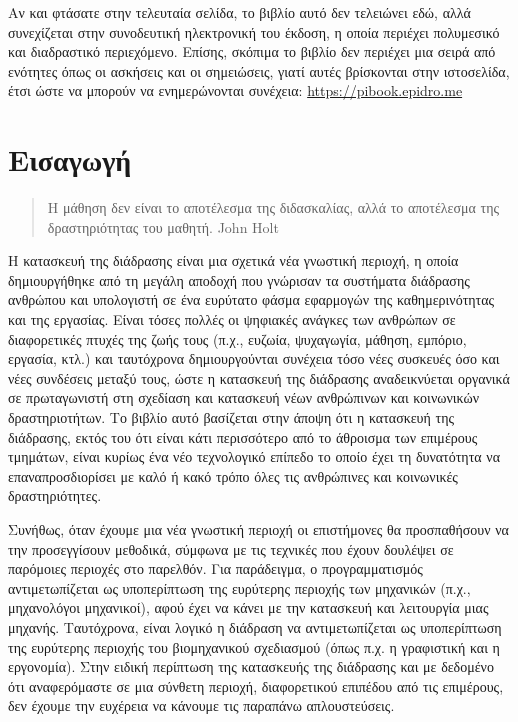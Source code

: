 \documentclass[
]{article}
\begin{document}
Αν και φτάσατε στην τελευταία σελίδα, το βιβλίο αυτό δεν τελειώνει εδώ,
αλλά συνεχίζεται στην συνοδευτική ηλεκτρονική του έκδοση, η οποία
περιέχει πολυμεσικό και διαδραστικό περιεχόμενο. Επίσης, σκόπιμα το
βιβλίο δεν περιέχει μια σειρά από ενότητες όπως οι ασκήσεις και οι
σημειώσεις, γιατί αυτές βρίσκονται στην ιστοσελίδα, έτσι ώστε να μπορούν
να ενημερώνονται συνέχεια: \url{https://pibook.epidro.me}

\hypertarget{ux3b5ux3b9ux3c3ux3b1ux3b3ux3c9ux3b3ux3ae}{%
\section{Εισαγωγή}\label{ux3b5ux3b9ux3c3ux3b1ux3b3ux3c9ux3b3ux3ae}}

\begin{quote}
Η μάθηση δεν είναι το αποτέλεσμα της διδασκαλίας, αλλά το αποτέλεσμα της
δραστηριότητας του μαθητή. John Holt
\end{quote}

Η κατασκευή της διάδρασης είναι μια σχετικά νέα γνωστική περιοχή, η
οποία δημιουργήθηκε από τη μεγάλη αποδοχή που γνώρισαν τα συστήματα
διάδρασης ανθρώπου και υπολογιστή σε ένα ευρύτατο φάσμα εφαρμογών της
καθημερινότητας και της εργασίας. Είναι τόσες πολλές οι ψηφιακές ανάγκες
των ανθρώπων σε διαφορετικές πτυχές της ζωής τους (π.χ., ευζωία,
ψυχαγωγία, μάθηση, εμπόριο, εργασία, κτλ.) και ταυτόχρονα δημιουργούνται
συνέχεια τόσο νέες συσκευές όσο και νέες συνδέσεις μεταξύ τους, ώστε η
κατασκευή της διάδρασης αναδεικνύεται οργανικά σε πρωταγωνιστή στη
σχεδίαση και κατασκευή νέων ανθρώπινων και κοινωνικών δραστηριοτήτων. Το
βιβλίο αυτό βασίζεται στην άποψη ότι η κατασκευή της διάδρασης, εκτός
του ότι είναι κάτι περισσότερο από το άθροισμα των επιμέρους τμημάτων,
είναι κυρίως ένα νέο τεχνολογικό επίπεδο το οποίο έχει τη δυνατότητα να
επαναπροσδιορίσει με καλό ή κακό τρόπο όλες τις ανθρώπινες και
κοινωνικές δραστηριότητες.

Συνήθως, όταν έχουμε μια νέα γνωστική περιοχή οι επιστήμονες θα
προσπαθήσουν να την προσεγγίσουν μεθοδικά, σύμφωνα με τις τεχνικές που
έχουν δουλέψει σε παρόμοιες περιοχές στο παρελθόν. Για παράδειγμα, ο
προγραμματισμός αντιμετωπίζεται ως υποπερίπτωση της ευρύτερης περιοχής
των μηχανικών (π.χ., μηχανολόγοι μηχανικοί), αφού έχει να κάνει με την
κατασκευή και λειτουργία μιας μηχανής. Ταυτόχρονα, είναι λογικό η
διάδραση να αντιμετωπίζεται ως υποπερίπτωση της ευρύτερης περιοχής του
βιομηχανικού σχεδιασμού (όπως π.χ. η γραφιστική και η εργονομία). Στην
ειδική περίπτωση της κατασκευής της διάδρασης και με δεδομένο ότι
αναφερόμαστε σε μια σύνθετη περιοχή, διαφορετικού επιπέδου από τις
επιμέρους, δεν έχουμε την ευχέρεια να κάνουμε τις παραπάνω
απλουστεύσεις.
\end{document}
